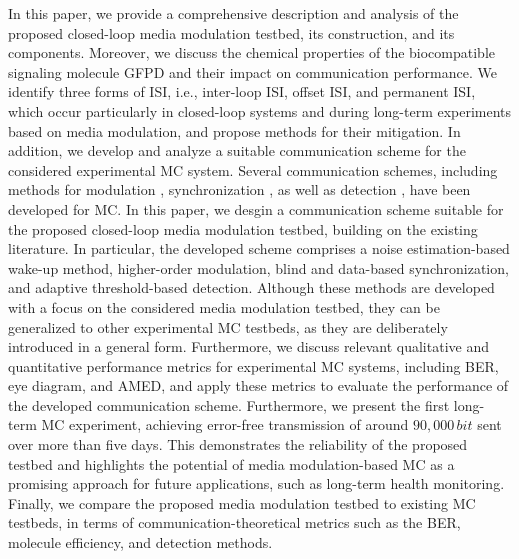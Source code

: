 In this paper, we provide a comprehensive description and analysis of the proposed closed-loop media modulation testbed, its construction, and its components. Moreover, we discuss the chemical properties of the biocompatible signaling molecule \ac{GFPD} and their impact on communication performance. We identify three forms of \ac{ISI}, i.e., inter-loop \ac{ISI}, offset \ac{ISI}, and permanent \ac{ISI}, which occur particularly in closed-loop systems and during long-term experiments based on media modulation, and propose methods for their mitigation. 
%
In addition, we develop and analyze a suitable communication scheme for the considered experimental \ac{MC} system. Several communication schemes, including methods for modulation \cite{kuran2020survey,wietfeld2024evaluation}, synchronization \cite{lin2016time, jamali2017symbol, Xuewen2024synchro,Debus2024synchro}, as well as detection \cite{khaloopour2019experimental,kuscu2021fabrication,walter2023real}, have been developed for \ac{MC}. In this paper, we desgin a communication scheme suitable for the proposed closed-loop media modulation testbed, building on the existing literature. In particular, the developed scheme comprises a noise estimation-based wake-up method, higher-order modulation, blind and data-based synchronization, and adaptive threshold-based detection.
Although these methods are developed with a focus on the considered media modulation testbed, they can be generalized to other experimental \ac{MC} testbeds, as they are deliberately introduced in a general form.
Furthermore, we discuss relevant qualitative and quantitative performance metrics for experimental \ac{MC} systems, including \ac{BER}, eye diagram, and \ac{AMED}, and apply these metrics to evaluate the performance of the developed communication scheme.
%
Furthermore, we present the first long-term \ac{MC} experiment, achieving error-free transmission of around $90,000 \, \si{bit}$ sent over more than five days. This demonstrates the reliability of the proposed testbed and highlights the potential of media modulation-based \ac{MC} as a promising approach for future applications, such as long-term health monitoring.
Finally, we compare the proposed media modulation testbed to existing \ac{MC} testbeds, in terms of communication-theoretical metrics such as the \ac{BER}, molecule efficiency, and detection methods. 

